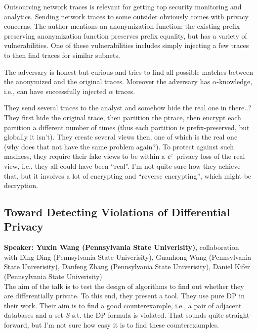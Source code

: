 \documentclass{article}
\begin{document}
Outsourcing network traces is relevant for getting top security monitoring and analytics. Sending network traces to some outsider obviously comes with privacy concerns.
The author mentions an anonymization function: the existing prefix preserving anonymization function preserves prefix equality, but has a variety of vulnerabilities. One of these vulnerabilities includes simply injecting a few traces to then find traces for similar subnets.

The adversary is honest-but-curious and tries to find all possible matches between the anonymized and the original traces. Moreover the adversary has $\alpha$-knowledge, i.e., can have successfully injected $\alpha$ traces.

They send several traces to the analyst and somehow hide the real one in there..?
They first hide the original trace, then partition the ptrace, then encrypt each partition a different number of times (thus each partition is prefix-preserved, but globally it isn't). They create several views then, one of which is the real one (why does that not have the same problem again?). To protect against such madness, they require their fake views to be within a $e^\varepsilon$ privacy loss of the real view, i.e., they all could have been ``real''. I'm not quite sure how they achieve that, but it involves a lot of encrypting and ``reverse encrypting'', which might be decryption.



\subsection{Toward Detecting Violations of Differential Privacy}
\noindent\textbf{Speaker: Yuxin Wang (Pennsylvania State Univerisity)}, collaboration with Ding Ding (Pennsylvania State Univerisity), Guanhong Wang (Pennsylvania State Univerisity), Danfeng Zhang (Pennsylvania State Univerisity), Daniel Kifer (Pennsylvania State Univerisity)\\

The aim of the talk is to test the design of algorithms to find out whether they are differentially private. To this end, they present a tool. They use pure DP in their work. Their aim is to find a good counterexample, i.e., a pair of adjacent databases and a set $S$ s.t. the DP formula is violated. That sounds quite straight-forward, but I'm not sure how easy it is to find these counterexamples.
\end{document}
